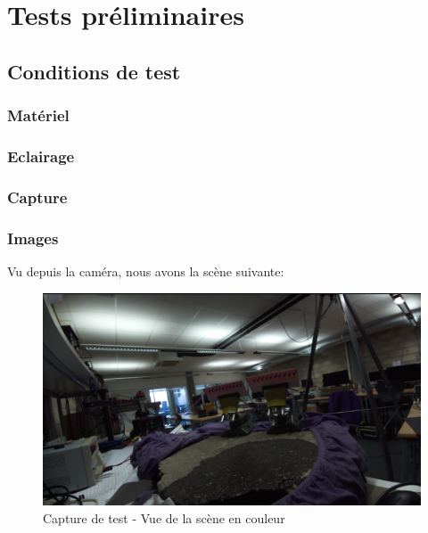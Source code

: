 \section{Tests préliminaires}
\subsection{Conditions de test}
\subsubsection{Matériel}

\subsubsection{Eclairage}
\subsubsection{Capture}
\subsubsection{Images}
Vu depuis la caméra, nous avons la scène suivante:

\begin{figure}[H]
    \centering
    \includegraphics[width=13cm]{assets/figures/camera_vue_couleur1.png}
    \caption{Capture de test - Vue de la scène en couleur}
\end{figure}

